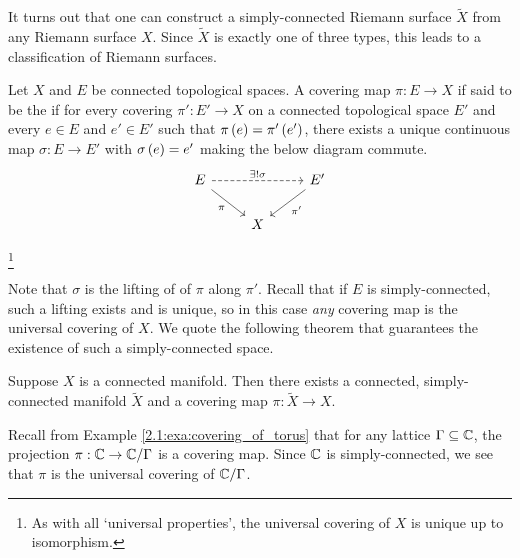 \documentclass[../Moduli_Spaces_of_Riemann_Surfaces.tex]{subfiles}
\begin{document}
    \begin{remark}
        It turns out that one can construct a simply-connected Riemann surface $\tilde{X}$ from any Riemann surface $X$. Since $\tilde{X}$ is exactly one of three types, this leads to a classification of Riemann surfaces.\exqed
    \end{remark}
    \begin{definition}
        Let $X$ and $E$ be connected topological spaces. A covering map $\pi:E\to X$ if said to be the  if for every covering $\pi':E'\to X$ on a connected topological space $E'$ and every $e\in E$ and $e'\in E'$ such that $\pi\left(e\right)=\pi'\left(e'\right)$, there exists a unique continuous map $\sigma:E\to E'$ with $\sigma\left(e\right)=e'$ making the below diagram commute.
        \begin{equation*}
            \begin{tikzcd}
                E \ar[rr, "\ex!\sigma", dashed] \ar[dr, "\pi"'] & & E' \ar[dl, "\pi'"] \\
                                                    & X
            \end{tikzcd}
        \end{equation*}
    \end{definition}
    \footnote{As with all `universal properties', the universal covering of $X$ is unique up to isomorphism.}
    \vspace{-0.05in}
    \begin{remark}
        Note that $\sigma$ is the lifting of of $\pi$ along $\pi'$. Recall that if $E$ is simply-connected, such a lifting exists and is unique, so in this case \textit{any} covering map is the universal covering of $X$. We quote the following theorem that guarantees the existence of such a simply-connected space.\exqed
    \end{remark}
    \begin{theorem}
        Suppose $X$ is a connected manifold. Then there exists a connected, simply-connected manifold $\tilde{X}$ and a covering map $\pi:\tilde{X}\to X$.
    \end{theorem}
    \begin{example}
        Recall from Example \ref{2.1:exa:covering_of_torus} that for any lattice $\Gamma\subseteq\mathbb{C}$, the projection $\pi:\mathbb{C}\to\mathbb{C}/\Gamma$ is a covering map. Since $\mathbb{C}$ is simply-connected, we see that $\pi$ is the universal covering of $\mathbb{C}/\Gamma$.\exqed
    \end{example}
\end{document}

